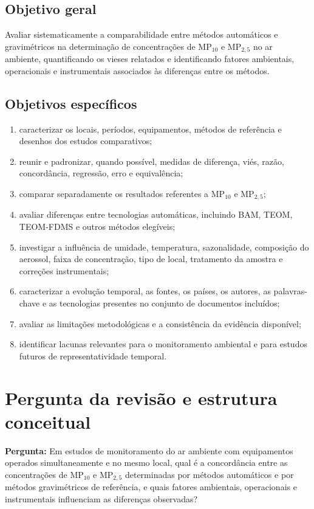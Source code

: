 \documentclass[11pt,a4paper]{article}
\newcommand{\MPdez}{MP$_{10}$}
\newcommand{\MPdoiscinco}{MP$_{2,5}$}
\begin{document}
\subsection{Objetivo geral}

Avaliar sistematicamente a comparabilidade entre métodos automáticos e gravimétricos
na determinação de concentrações de \MPdez{} e \MPdoiscinco{} no ar ambiente,
quantificando os vieses relatados e identificando fatores ambientais, operacionais e
instrumentais associados às diferenças entre os métodos.

\subsection{Objetivos específicos}

\begin{enumerate}[label=\alph*)]
  \item caracterizar os locais, períodos, equipamentos, métodos de referência e
  desenhos dos estudos comparativos;
  \item reunir e padronizar, quando possível, medidas de diferença, viés, razão,
  concordância, regressão, erro e equivalência;
  \item comparar separadamente os resultados referentes a \MPdez{} e
  \MPdoiscinco{};
  \item avaliar diferenças entre tecnologias automáticas, incluindo BAM, TEOM,
  TEOM-FDMS e outros métodos elegíveis;
  \item investigar a influência de umidade, temperatura, sazonalidade, composição
  do aerossol, faixa de concentração, tipo de local, tratamento da amostra e
  correções instrumentais;
  \item caracterizar a evolução temporal, as fontes, os países, os autores, as
  palavras-chave e as tecnologias presentes no conjunto de documentos incluídos;
  \item avaliar as limitações metodológicas e a consistência da evidência disponível;
  \item identificar lacunas relevantes para o monitoramento ambiental e para estudos
  futuros de representatividade temporal.
\end{enumerate}

\section{Pergunta da revisão e estrutura conceitual}

\textbf{Pergunta:} Em estudos de monitoramento do ar ambiente com equipamentos
operados simultaneamente e no mesmo local, qual é a concordância entre as
concentrações de \MPdez{} e \MPdoiscinco{} determinadas por métodos automáticos e
por métodos gravimétricos de referência, e quais fatores ambientais, operacionais e
instrumentais influenciam as diferenças observadas?
\end{document}
